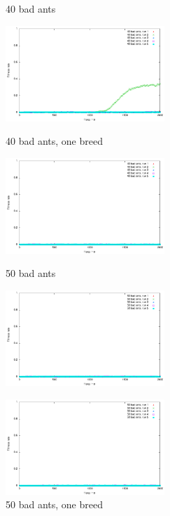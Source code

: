 \documentclass[titlepage, a4paper, 12pt]{article}
\begin{document}
\begin{figure}[H]
  \begin{minipage}[b]{0.5\linewidth}
    \centering
    \caption{40 bad ants }\label{fig:images/graph40}
    \includegraphics[width=6cm]{images/graph40.pdf}
  \end{minipage}
  \begin{minipage}[b]{0.5\linewidth}
    \centering
    \caption{40 bad ants, one breed }\label{fig:images/graph40oneBreed}
    \includegraphics[width=6cm]{images/graph40oneBreed.pdf}
  \end{minipage}
  
  \hspace{0.5cm}
  
  \begin{minipage}[b]{0.5\linewidth}
    \centering
    \caption{50 bad ants }\label{fig:images/graph50}
    \includegraphics[width=6cm]{images/graph50.pdf}
  \end{minipage}
  \begin{minipage}[b]{0.5\linewidth}
    \centering
    \caption{50 bad ants, one breed }\label{fig:images/graph50oneBreed}
    \includegraphics[width=6cm]{images/graph50oneBreed.pdf}
  \end{minipage}
\end{figure}
\end{document}
